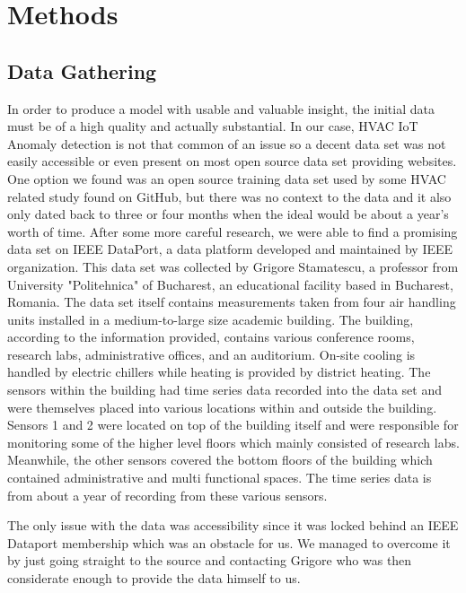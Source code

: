 \documentclass[conference]{IEEEtran}
\begin{document}
\section{Methods}

\subsection{Data Gathering}

In order to produce a model with usable and valuable insight, the initial data must be of a high quality and actually substantial. In our case, HVAC IoT Anomaly detection is not that common of an issue so a decent data set was not easily accessible or even present on most open source data set providing websites. One option we found was an open source training data set used by some HVAC related study found on GitHub, but there was no context to the data and it also only dated back to three or four months when the ideal would be about a year's worth of time. After some more careful research, we were able to find a promising data set on IEEE DataPort, a data platform developed and maintained by IEEE organization. This data set was collected by Grigore Stamatescu, a professor from University "Politehnica" of Bucharest, an educational facility based in Bucharest, Romania. The data set itself contains measurements
taken from four air handling units installed in a medium-to-large size academic building. The building, according to the information provided, contains various conference rooms, research labs, administrative offices, and an auditorium. On-site cooling is handled by electric chillers while heating is provided by district heating. The sensors within the building had time series data recorded into the data set and were themselves placed into various locations within and outside the building. Sensors 1 and 2 were located on top of the building itself and were responsible for monitoring some of the higher level floors which mainly consisted of research labs. Meanwhile, the other sensors covered the bottom floors of the building which contained administrative and multi functional spaces. The time series data is from about a year of recording from these various sensors.

The only issue with the data was accessibility since it was locked behind an IEEE Dataport membership which was an obstacle for us. We managed to overcome it by just going straight to the source and contacting Grigore who was then considerate enough to provide the data himself to us.
\end{document}
